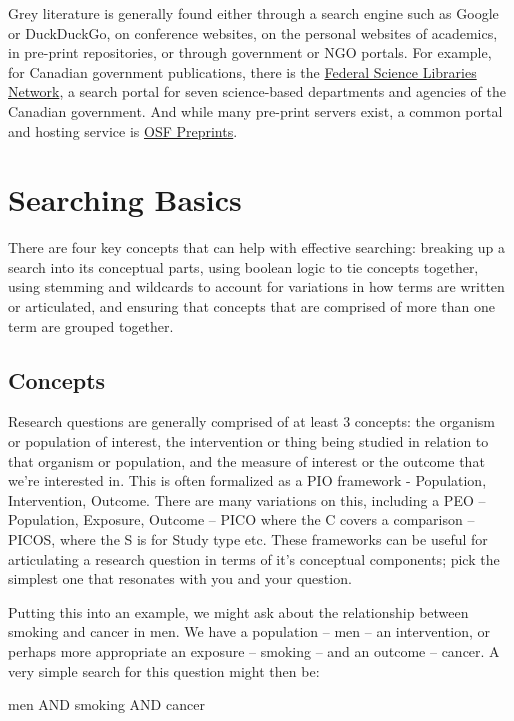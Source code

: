 \documentclass[
]{book}
\begin{document}
Grey literature is generally found either through a search engine such as Google or DuckDuckGo, on conference websites, on the personal websites of academics, in pre-print repositories, or through government or NGO portals. For example, for Canadian government publications, there is the \href{https://science-libraries.canada.ca/eng/home/}{Federal Science Libraries Network}, a search portal for seven science-based departments and agencies of the Canadian government. And while many pre-print servers exist, a common portal and hosting service is \href{https://osf.io/preprints/}{OSF Preprints}.

\section{Searching Basics}\label{searching-basics}

There are four key concepts that can help with effective searching: breaking up a search into its conceptual parts, using boolean logic to tie concepts together, using stemming and wildcards to account for variations in how terms are written or articulated, and ensuring that concepts that are comprised of more than one term are grouped together.

\subsection{Concepts}\label{concepts}

Research questions are generally comprised of at least 3 concepts: the organism or population of interest, the intervention or thing being studied in relation to that organism or population, and the measure of interest or the outcome that we're interested in. This is often formalized as a PIO framework - Population, Intervention, Outcome. There are many variations on this, including a PEO -- Population, Exposure, Outcome -- PICO where the C covers a comparison -- PICOS, where the S is for Study type etc. These frameworks can be useful for articulating a research question in terms of it's conceptual components; pick the simplest one that resonates with you and your question.

Putting this into an example, we might ask about the relationship between smoking and cancer in men. We have a population -- men -- an intervention, or perhaps more appropriate an exposure -- smoking -- and an outcome -- cancer. A very simple search for this question might then be:

men AND smoking AND cancer
\end{document}
